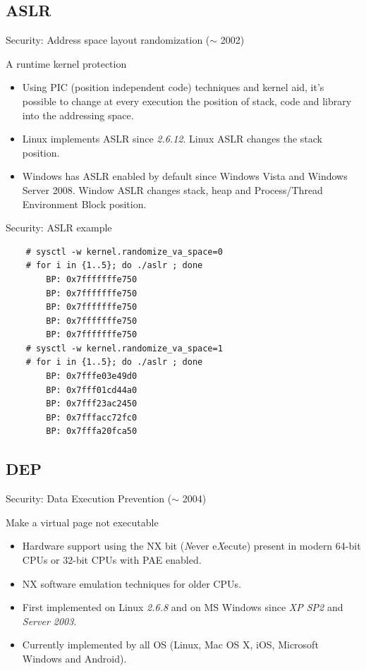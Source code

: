 \subsection{ASLR}
\begin{frame}[fragile]{Security: Address space layout randomization ($\sim$ 2002)}
	\begin{block}{A runtime kernel protection}
		\begin{itemize}
			\item Using PIC (position independent code) techniques and kernel aid,
				it's possible to change at every execution the position of stack, code
				and library into the addressing space.
			\item Linux implements ASLR since \emph{2.6.12}. Linux ASLR changes the
				stack position.
			\item Windows has ASLR enabled by default since Windows Vista and Windows
				Server 2008. Window ASLR changes stack, heap and Process/Thread
				Environment Block position.
		\end{itemize}
	\end{block}
\end{frame}

\begin{frame}[fragile]{Security: ASLR example}
	\begin{lstlisting}
	# sysctl -w kernel.randomize_va_space=0
	# for i in {1..5}; do ./aslr ; done
		BP: 0x7fffffffe750
		BP: 0x7fffffffe750
		BP: 0x7fffffffe750
		BP: 0x7fffffffe750
		BP: 0x7fffffffe750
	# sysctl -w kernel.randomize_va_space=1
	# for i in {1..5}; do ./aslr ; done
		BP: 0x7fffe03e49d0
		BP: 0x7fff01cd44a0
		BP: 0x7fff23ac2450
		BP: 0x7fffacc72fc0
		BP: 0x7fffa20fca50
	\end{lstlisting}
\end{frame}

\subsection{DEP}
\begin{frame}{Security: Data Execution Prevention ($\sim$ 2004)}
	\begin{block}{Make a virtual page not executable}
		\begin{itemize}
			\item Hardware support using the NX bit (\emph{N}ever e\emph{X}ecute)
				present in modern 64-bit CPUs or 32-bit CPUs with PAE enabled.
			\item NX software emulation techniques for older CPUs.
			\item First implemented on Linux \emph{2.6.8} and on MS Windows since
				\emph{XP SP2} and \emph{Server 2003}.
			\item Currently implemented by all OS (Linux, Mac OS X, iOS, Microsoft Windows and Android).
		\end{itemize}
	\end{block}
\end{frame}

